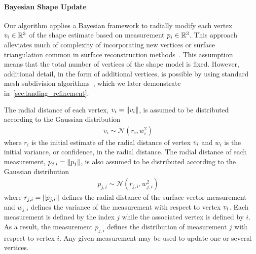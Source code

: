 \paragraph{Bayesian Shape Update}

Our algorithm applies a Bayesian framework to radially modify each vertex \( v_i \in \mathbb{R}^3\) of the shape estimate based on measurement \( p_i \in \mathbb{R}^3 \). 
This approach alleviates much of complexity of incorporating new vertices or surface triangulation common in surface reconstruction methods~\cite{berg2008}.
This assumption means that the total number of vertices of the shape model is fixed.
However, additional detail, in the form of additional vertices, is possible by using standard mesh subdivision algorithms~\cite{orourke1998}, which we later demonstrate in~\cref{sec:landing_refinement}.

The radial distance of each vertex, \( v_i = \left\| v_i \right\|\), is assumed to be distributed according to the Gaussian distribution
\begin{align*}
    v_i \sim \mathcal{N}(r_i, w_i^2)
\end{align*}
where \( r_i \) is the initial estimate of the radial distance of vertex \( v_i\) and \( w_i \) is the initial variance, or confidence, in the radial distance.
The radial distance of each measurement, \( p_{j,i} = \left\| p_j \right\|\), is also assumed to be distributed according to the Gaussian distribution
\begin{align*}
    p_{j,i} \sim \mathcal{N}(r_{j,i}, w_{j,i}^2)
\end{align*}
where \( r_{j,i} = \left\| p_{j,i} \right\| \) defines the radial distance of the surface vector measurement and \( w_{j, i}\) defines the variance of the measurement with respect to vertex \( v_i\).
Each measurement is defined by the index \( j \) while the associated vertex is defined by \( i \). 
As a result, the measurement \( p_{j, i} \) defines the distribution of measurement \( j \) with respect to vertex \( i \). 
Any given measurement may be used to update one or several vertices.

